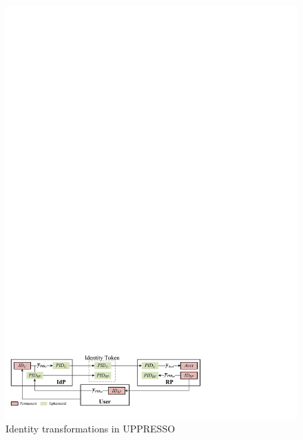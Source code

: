 \begin{figure}[tb]
  \centering
  \includegraphics[width=1.00\linewidth]{fig/IDCorrelation.pdf}
  \caption{Identity transformations in UPPRESSO} %
  \label{fig:IDCorrelation}
\end{figure}

